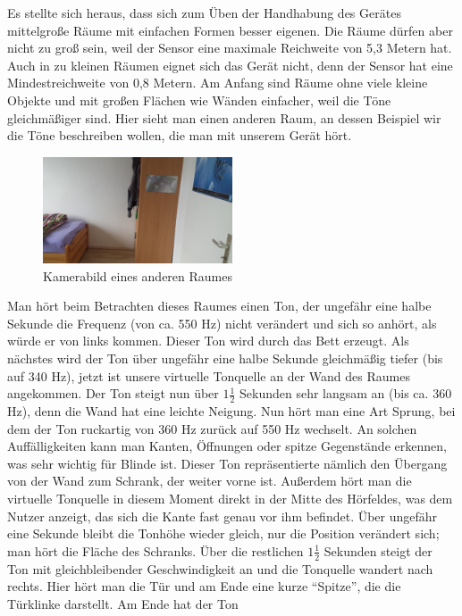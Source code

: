 \documentclass[a4paper,12pt,ngerman]{scrartcl}
\begin{document}
Es stellte sich heraus, dass sich zum Üben der Handhabung des Gerätes mittelgroße Räume mit einfachen
Formen besser eigenen. Die Räume dürfen aber nicht zu groß sein, weil der Sensor eine maximale Reichweite
von 5,3 Metern hat. Auch in zu kleinen Räumen eignet sich das Gerät nicht, denn der Sensor hat eine  Mindestreichweite von 0,8 Metern. Am Anfang sind Räume ohne viele kleine Objekte und mit großen 
Flächen wie Wänden einfacher, weil die Töne gleichmäßiger sind.
Hier sieht man einen anderen Raum, an dessen Beispiel wir die Töne beschreiben wollen, die man
mit unserem Gerät hört.
\begin{figure}[H]
	\centering
	\includegraphics[angle=180,width=0.5\textwidth]{20180120_114953}
	\caption{Kamerabild eines anderen Raumes}
	\label{normal_picture}
\end{figure} \par
Man hört beim Betrachten dieses Raumes einen Ton, der ungefähr eine halbe Sekunde die Frequenz (von ca. 550 Hz) nicht verändert und sich so anhört, als würde er von links kommen. Dieser Ton wird durch das Bett
erzeugt. Als nächstes wird der Ton über ungefähr eine halbe Sekunde gleichmäßig tiefer (bis auf 340 Hz), 
jetzt ist unsere virtuelle Tonquelle an der Wand des Raumes angekommen. Der Ton steigt nun über $1\frac{1}{2}$ Sekunden sehr langsam an (bis ca. 360 Hz), denn die Wand hat eine leichte Neigung. 
Nun hört man eine Art Sprung, bei dem der Ton ruckartig von 360 Hz zurück auf 550 Hz wechselt. An solchen Auffälligkeiten kann man Kanten, Öffnungen oder spitze Gegenstände erkennen, was sehr wichtig für Blinde
ist. Dieser Ton repräsentierte nämlich den Übergang von der Wand zum Schrank, der weiter vorne ist. Außerdem hört
man die virtuelle Tonquelle in diesem Moment direkt in der Mitte des Hörfeldes, was dem Nutzer anzeigt, das sich
die Kante fast genau vor ihm befindet. Über ungefähr eine Sekunde bleibt die Tonhöhe wieder gleich, nur die Position
verändert sich; man hört die Fläche des Schranks. Über die restlichen $1\frac{1}{2}$ Sekunden steigt der Ton mit 
gleichbleibender Geschwindigkeit an und die Tonquelle wandert nach rechts.
Hier hört man die Tür und am Ende eine kurze \enquote{Spitze}, die die Türklinke darstellt. Am Ende hat der Ton
\end{document}
